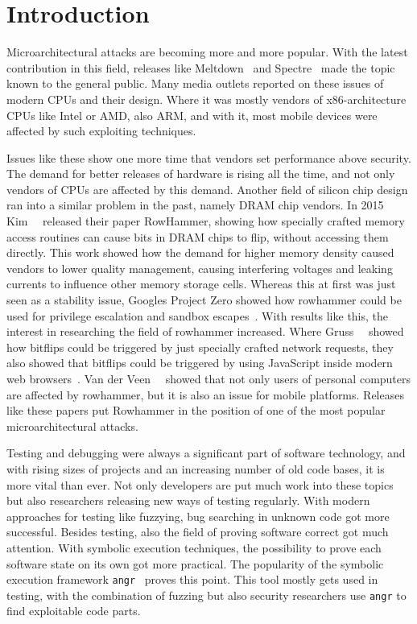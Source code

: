 \chapter{Introduction}\label{sec:intro}

Microarchitectural attacks are becoming more and more popular. With the latest
contribution in this field, releases like Meltdown~\cite{meltdown} and
Spectre~\cite{spectre} made the topic known to the general public. Many media
outlets reported on these issues of modern CPUs and their design. Where it was
mostly vendors of x86-architecture CPUs like Intel or AMD, also ARM, and with
it, most mobile devices were affected by such exploiting techniques.

Issues like these show one more time that vendors set performance above
security. The demand for better releases of hardware is rising all the time, and
not only vendors of CPUs are affected by this demand. Another field of silicon
chip design ran into a similar problem in the past, namely DRAM chip vendors. In
2015 Kim~\etal~\cite{rowhammergeneral} released their paper \textquotedbl
RowHammer\textquotedbl, showing how specially crafted memory access routines
can cause bits in DRAM chips to flip, without accessing them directly. This
work showed how the demand for higher memory density caused vendors to lower
quality management, causing interfering voltages and leaking currents to
influence other memory storage cells. Whereas this at first was just seen as a
stability issue, Google\textquotesingle s Project Zero showed how rowhammer
could be used for privilege escalation and sandbox
escapes~\cite{projectzerorow}. With results like this, the interest in
researching the field of rowhammer increased. Where Gruss~\etal~\cite{nethammer}
showed how bitflips could be triggered by just specially crafted network
requests, they also showed that bitflips could be triggered by using JavaScript
inside modern web browsers~\cite{rowhammerjs}. Van der Veen~\etal~\cite{drammer}
showed that not only users of personal computers are affected by rowhammer, but
it is also an issue for mobile platforms. Releases like these papers put
Rowhammer in the position of one of the most popular microarchitectural attacks.

Testing and debugging were always a significant part of software technology, and
with rising sizes of projects and an increasing number of old code bases, it is
more vital than ever. Not only developers are put much work into these
topics but also researchers releasing new ways of testing regularly. With modern
approaches for testing like fuzzying, bug searching in unknown code got more
successful. Besides testing, also the field of proving software correct got
much attention. With symbolic execution techniques, the possibility to prove
each software state on its own got more practical. The popularity of the
symbolic execution framework \texttt{angr}~\cite{angrpaper} proves this point.
This tool mostly gets used in testing, with the combination of fuzzing but also
security researchers use \texttt{angr} to find exploitable code parts.

